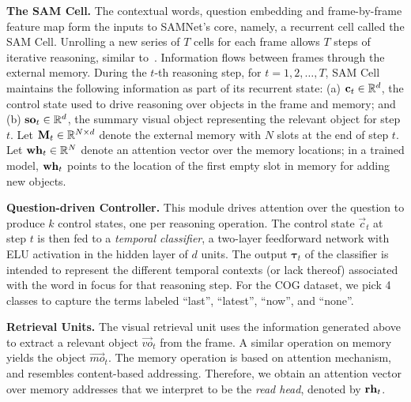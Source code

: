 \smallskip

\noindent\textbf{The SAM Cell.} The contextual words, question embedding and frame-by-frame feature map form the inputs to SAMNet's core, namely, a recurrent cell called the SAM Cell. Unrolling a new series of $T$ cells for each frame allows $T$ steps of iterative reasoning, similar to~\cite{hudson2018compositional}. Information flows between frames through the external memory.
During the $t$-th reasoning step, for $t=1,2, \dots, T$, SAM Cell maintains the following information as part of its recurrent state:
(a) $\mathbf{c}_t \in \mathbb{R}^d$, the control state used to drive reasoning over objects in the frame and memory; and
(b) $\mathbf{so}_t  \in \mathbb{R}^d$, the summary visual object representing the relevant object for step $t$.
Let $\mathbf{M}_t \in  \mathbb{R}^{N \times d}$ denote the external memory with $N$ slots at the end of step $t$.
Let $\mathbf{wh}_t \in  \mathbb{R}^N$ denote an attention vector over the memory locations;
in a trained model, $\mathbf{wh}_t$ points to the location of the first empty slot in memory for adding new objects.

\smallskip

\noindent\textbf{Question-driven Controller.}
This module drives attention over the question to produce $k$ control states, one per reasoning operation.
The control state $\vec{c}_t$ at step $t$ is then fed to a \emph{temporal classifier},
a two-layer feedforward network with ELU activation in the hidden layer of $d$ units.
The output $\bm{\tau}_t$ of the classifier is intended to represent the different temporal contexts (or lack thereof) associated with the word in focus for that reasoning step.
For the COG dataset, we pick 4 classes to capture the terms labeled ``last'', ``latest'', ``now'', and ``none''.

\smallskip

\noindent\textbf{Retrieval Units.} The visual retrieval unit uses the information generated above to extract a relevant object $\vec{vo}_t$ from the frame.
A similar operation on memory yields the object $\vec{mo}_t$. The memory operation is based on attention mechanism, and resembles content-based addressing. Therefore, we obtain an attention vector over memory addresses that we interpret to be the \emph{read head}, denoted by $\mathbf{rh}_t$.

\smallskip

